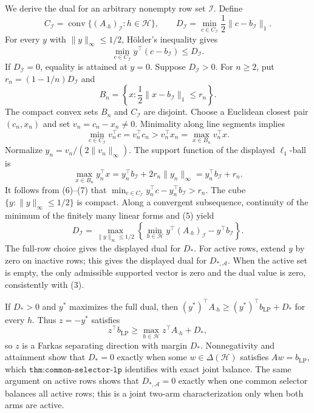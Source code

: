We derive the dual for an arbitrary nonempty row set \(\mathcal I\). Define
\[
C_{\mathcal I}=\operatorname{conv}\{(A_{\cdot h})_{\mathcal I}:h\in\mathcal H\},\qquad D_{\mathcal I}=\min_{c\in C_{\mathcal I}}\frac12\lVert c-b_{\mathcal I}\rVert_1.
\tag{4}
\]
For every \(y\) with \(\lVert y\rVert_\infty\le1/2\), Hölder's inequality gives
\[
\min_{c\in C_{\mathcal I}}y^\top(c-b_{\mathcal I})\le D_{\mathcal I}.
\tag{5}
\]
If \(D_{\mathcal I}=0\), equality is attained at \(y=0\). Suppose \(D_{\mathcal I}>0\). For \(n\ge2\), put \(r_n=(1-1/n)D_{\mathcal I}\) and
\[
B_n=\left\{x:\frac12\lVert x-b_{\mathcal I}\rVert_1\le r_n\right\}.
\]
The compact convex sets \(B_n\) and \(C_{\mathcal I}\) are disjoint. Choose a Euclidean closest pair \((c_n,x_n)\) and set \(v_n=c_n-x_n\ne0\). Minimality along line segments implies
\[
\min_{c\in C_{\mathcal I}}v_n^\top c=v_n^\top c_n>v_n^\top x_n=\max_{x\in B_n}v_n^\top x.
\tag{6}
\]
Normalize \(y_n=v_n/(2\lVert v_n\rVert_\infty)\). The support function of the displayed \(\ell_1\)-ball is
\[
\max_{x\in B_n}y_n^\top x=y_n^\top b_{\mathcal I}+2r_n\lVert y_n\rVert_\infty=y_n^\top b_{\mathcal I}+r_n.
\tag{7}
\]
It follows from (6)--(7) that \(\min_{c\in C_{\mathcal I}}y_n^\top c-y_n^\top b_{\mathcal I}>r_n\). The cube \(\{y:\lVert y\rVert_\infty\le1/2\}\) is compact. Along a convergent subsequence, continuity of the minimum of the finitely many linear forms and (5) yield
\[
D_{\mathcal I}=\max_{\lVert y\rVert_\infty\le1/2}\left\{\min_{h\in\mathcal H}y^\top(A_{\cdot h})_{\mathcal I}-y^\top b_{\mathcal I}\right\}.
\tag{8}
\]
The full-row choice gives the displayed dual for \(D_*\). For active rows, extend \(y\) by zero on inactive rows; this gives the displayed dual for \(D_{*,\mathcal A}\). When the active set is empty, the only admissible supported vector is zero and the dual value is zero, consistently with (3).

If \(D_*>0\) and \(y^*\) maximizes the full dual, then \((y^*)^\top A_{\cdot h}\ge(y^*)^\top b_{\mathrm{LP}}+D_*\) for every \(h\). Thus \(z=-y^*\) satisfies
\[
z^\top b_{\mathrm{LP}}\ge\max_{h\in\mathcal H}z^\top A_{\cdot h}+D_*,
\]
so \(z\) is a Farkas separating direction with margin \(D_*\). Nonnegativity and attainment show that \(D_*=0\) exactly when some \(w\in\Delta(\mathcal H)\) satisfies \(Aw=b_{\mathrm{LP}}\), which \(\texttt{thm:common-selector-lp}\) identifies with exact joint balance. The same argument on active rows shows that \(D_{*,\mathcal A}=0\) exactly when one common selector balances all active rows; this is a joint two-arm characterization only when both arms are active.

